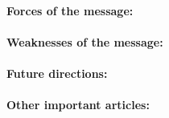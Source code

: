 \documentclass[11pt]{article}
\begin{document}
\paragraph{Forces of the message:}

\paragraph{Weaknesses of the message:}

\paragraph{Future directions:}

\paragraph{Other important articles:}
\end{document}
